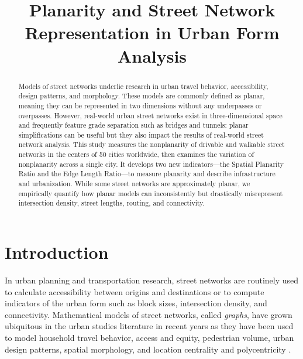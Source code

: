 \documentclass[Afour,doublespace,sageh,times]{sagej}
\begin{document}
\runninghead{}
\title{Planarity and Street Network Representation in Urban Form Analysis}
\author{}
\affiliation{}
\corrauth{}
\email{}



\begin{abstract}

Models of street networks underlie research in urban travel behavior, accessibility, design patterns, and morphology. These models are commonly defined as planar, meaning they can be represented in two dimensions without any underpasses or overpasses. However, real-world urban street networks exist in three-dimensional space and frequently feature grade separation such as bridges and tunnels: planar simplifications can be useful but they also impact the results of real-world street network analysis. This study measures the nonplanarity of drivable and walkable street networks in the centers of 50 cities worldwide, then examines the variation of nonplanarity across a single city. It develops two new indicators---the Spatial Planarity Ratio and the Edge Length Ratio---to measure planarity and describe infrastructure and urbanization. While some street networks are approximately planar, we empirically quantify how planar models can inconsistently but drastically misrepresent intersection density, street lengths, routing, and connectivity.

\end{abstract}


\maketitle



\section{Introduction}

In urban planning and transportation research, street networks are routinely used to calculate accessibility between origins and destinations or to compute indicators of the urban form such as block sizes, intersection density, and connectivity. Mathematical models of street networks, called \emph{graphs}, have grown ubiquitous in the urban studies literature in recent years as they have been used to model household travel behavior, access and equity, pedestrian volume, urban design patterns, spatial morphology, and location centrality and polycentricity \citep{marshall_street_2010,pflieger_switzerland_2010,porta_street_2012,lee_identifying_2014,porta_alterations_2014,marshall_community_2014,hajrasouliha_impact_2015,parthasarathi_street_2015,knight_metrics_2015,xiao_identifying_2016,zhong_revealing_2017}.
\end{document}
